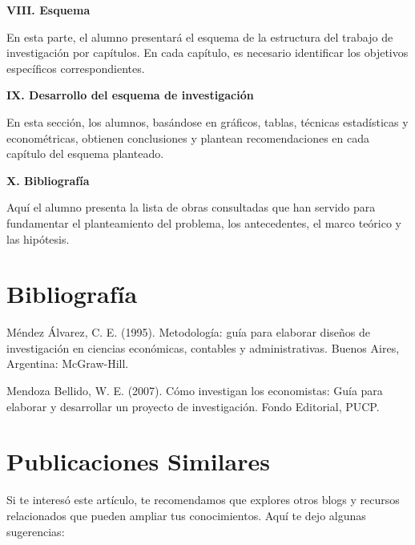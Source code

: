 \documentclass[
  jou,
  floatsintext,
  longtable,
  a4paper,
  nolmodern,
  notxfonts,
  notimes,
  12pt,
  colorlinks=true,linkcolor=blue,citecolor=blue,urlcolor=blue]{apa7}
\begin{document}
\textbf{VIII. Esquema}

En esta parte, el alumno presentará el esquema de la estructura del
trabajo de investigación por capítulos. En cada capítulo, es necesario
identificar los objetivos específicos correspondientes.

\textbf{IX. Desarrollo del esquema de investigación}

En esta sección, los alumnos, basándose en gráficos, tablas, técnicas
estadísticas y econométricas, obtienen conclusiones y plantean
recomendaciones en cada capítulo del esquema planteado.

\textbf{X. Bibliografía}

Aquí el alumno presenta la lista de obras consultadas que han servido
para fundamentar el planteamiento del problema, los antecedentes, el
marco teórico y las hipótesis.

\section{Bibliografía}\label{bibliografuxeda}

Méndez Álvarez, C. E. (1995). Metodología: guía para elaborar diseños de
investigación en ciencias económicas, contables y administrativas.
Buenos Aires, Argentina: McGraw-Hill.

Mendoza Bellido, W. E. (2007). Cómo investigan los economistas: Guía
para elaborar y desarrollar un proyecto de investigación. Fondo
Editorial, PUCP.

\section{Publicaciones Similares}\label{publicaciones-similares}

Si te interesó este artículo, te recomendamos que explores otros blogs y
recursos relacionados que pueden ampliar tus conocimientos. Aquí te dejo
algunas sugerencias:
\end{document}
